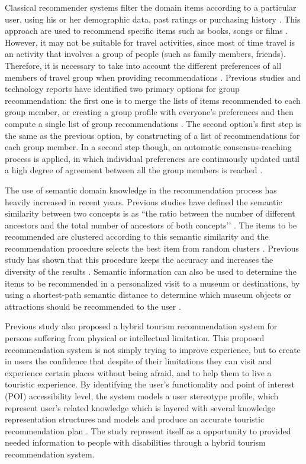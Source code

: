 Classical recommender systems filter the domain items according to a particular user, 
using his or her demographic data, past ratings or purchasing history \cite{LU201512}. 
This approach are used to recommend specific items such as books, songs or films 
\cite{LU201512}. However, it may not be suitable for travel activities, since most 
of time travel is an activity that involves a group of people (such as family members, 
friends). Therefore, it is necessary to take into account the different preferences of 
all members of travel group when providing recommendations \cite{morenorecommender}. 
Previous studies and technology reports have identified two primary options for group 
recommendation: the first one is to merge the lists of items recommended to each group 
member, or creating a group profile with everyone’s preferences and then compute a 
single list of group recommendations \cite{Garcia2009}. The second option’s first 
step is the same as the previous option, by constructing of a list of recommendations 
for each group member. In a second step though, an automatic consensus-reaching 
process is applied, in which individual preferences are continuously updated until 
a high degree of agreement between all the group members is reached \cite{Garcia2009}.

The use of semantic domain knowledge in the recommendation process has heavily 
increased in recent years. Previous studies have defined the semantic similarity 
between two concepts is as ``the ratio between the number of different ancestors 
and the total number of ancestors of both concepts’’ \cite{morenorecommender}. 
The items to be recommended are clustered according to this semantic similarity 
and the recommendation procedure selects the best item from random clusters \cite{Santos2018}. 
Previous study has shown that this procedure keeps the accuracy and increases 
the diversity of the results \cite{morenorecommender}. Semantic information can 
also be used to determine the items to be recommended in a personalized visit to 
a museum or destinations, by using a shortest-path semantic distance to determine
which museum objects or attractions should be recommended to the user \cite{morenorecommender}. 

Previous study also proposed a hybrid tourism recommendation system for persons 
suffering from physical or intellectual limitation. This proposed recommendation 
system is not simply trying to improve experience, but to create in users the 
confidence that despite of their limitations they can visit and experience certain
places without being afraid, and to help them to live a touristic experience. By
identifying the user’s functionality and point of interest (POI) accessibility level, 
the system models a user stereotype profile, which represent user’s related knowledge
which is layered with several knowledge representation structures and models 
and produce an accurate touristic recommendation plan \cite{Santos2018}. 
The study represent itself as a opportunity to provided needed information to 
people with disabilities through a hybrid tourism recommendation system. 



